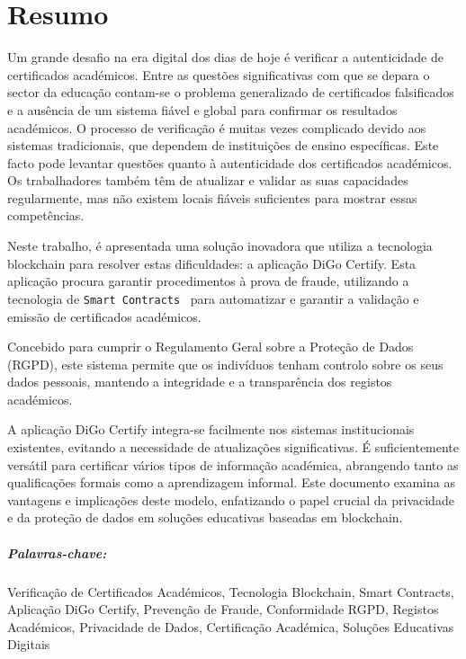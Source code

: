 %
%
\chapter*{Resumo}\label{chap:resumo}

Um grande desafio na era digital dos dias de hoje é verificar a autenticidade de certificados académicos. Entre as questões significativas com que se depara o sector da educação contam-se o problema generalizado de certificados falsificados e a ausência de um sistema fiável e global para confirmar os resultados académicos. O processo de verificação é muitas vezes complicado devido aos sistemas tradicionais, que dependem de instituições de ensino específicas. Este facto pode levantar questões quanto à autenticidade dos certificados académicos. Os trabalhadores também têm de atualizar e validar as suas capacidades regularmente, mas não existem locais fiáveis suficientes para mostrar essas competências.

Neste trabalho, é apresentada uma solução inovadora que utiliza a tecnologia blockchain para resolver estas dificuldades: a aplicação DiGo Certify. Esta aplicação procura garantir procedimentos à prova de fraude, utilizando a tecnologia de \texttt{Smart Contracts}~\cite{vigliotti2021we} para automatizar e garantir a validação e emissão de certificados académicos.

Concebido para cumprir o Regulamento Geral sobre a Proteção de Dados (RGPD), este sistema permite que os indivíduos tenham controlo sobre os seus dados pessoais, mantendo a integridade e a transparência dos registos académicos.

A aplicação DiGo Certify integra-se facilmente nos sistemas institucionais existentes, evitando a necessidade de atualizações significativas. É suficientemente versátil para certificar vários tipos de informação académica, abrangendo tanto as qualificações formais como a aprendizagem informal. Este documento examina as vantagens e implicações deste modelo, enfatizando o papel crucial da privacidade e da proteção de dados em soluções educativas baseadas em blockchain.

\paragraph{Palavras-chave:} Verificação de Certificados Académicos, Tecnologia Blockchain, Smart Contracts, Aplicação DiGo Certify, Prevenção de Fraude, Conformidade RGPD, Registos Académicos, Privacidade de Dados, Certificação Académica, Soluções Educativas Digitais